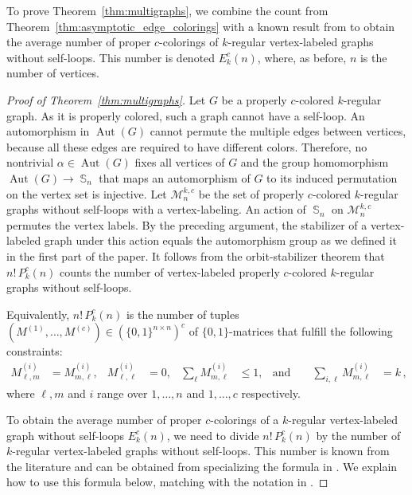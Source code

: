 \documentclass[a4paper,oneside]{amsart}
\numberwithin{theorem}{section}
\theoremstyle{remark}
\DeclareMathOperator{\Aut}{Aut}
\newcommand{\cE}{{P}}
\DeclareMathOperator{\Sym}{\mathbb{S}}
\begin{document}
To prove Theorem~\ref{thm:multigraphs}, we combine the count from Theorem~\ref{thm:asymptotic_edge_colorings} with a known result from \cite{bender1978asymptotic} to obtain the average number of proper $c$-colorings of $k$-regular vertex-labeled graphs without self-loops. This number is denoted ${E}^{c}_k(n)$, where, as before, $n$ is the number of vertices. 

\begin{proof}[Proof of Theorem~\ref{thm:multigraphs}]
  Let $G$ be a properly $c$-colored $k$-regular graph. As it is properly colored, such a graph cannot have a self-loop. An automorphism in $\Aut(G)$ cannot permute the multiple edges between vertices, because all these edges are required to have different colors. Therefore, no nontrivial $\alpha \in \Aut(G)$ fixes all vertices of $G$ and the group homomorphism $\Aut(G) \rightarrow \Sym_n$ that maps an automorphism of $G$ to its induced permutation on the vertex set is injective.
Let $\mathcal M_n^{k,c}$ be the set of 
properly $c$-colored $k$-regular graphs without self-loops with a vertex-labeling. An action of 
$\Sym_n$ on $\mathcal M_n^{k,c}$ permutes the vertex labels. By the preceding argument, the stabilizer of a vertex-labeled graph under this action equals the automorphism group as we defined it in the first part of the paper. It follows from the orbit-stabilizer theorem that $n!\, \cE^{c}_k(n)$ counts the number of vertex-labeled properly $c$-colored $k$-regular graphs without self-loops. 

Equivalently, $n!\, \cE^{c}_k(n)$ is the number of tuples $(M^{(1)}, \ldots, M^{(c)}) \in (\{0,1\}^{n\times n})^c$ of $\{0,1\}$-matrices that fulfill the following constraints:
\begin{align*}
M^{(i)}_{\ell,m} &= M^{(i)}_{m,\ell}, &
M^{(i)}_{\ell,\ell} &= 0, &
\sum_{\ell} M^{(i)}_{m,\ell} &\leq 1, & \text{and }&&
\sum_{i,\ell} M^{(i)}_{m,\ell} &= k  \,,
\end{align*}
where $\ell,m$ and $i$ 
range over $1,\ldots,n$ and $1,\ldots,c$ 
respectively. \par

To obtain the average number of proper $c$-colorings of a $k$-regular vertex-labeled graph without self-loops ${E}^{c}_k(n)$, we need to divide $n!\, \cE^{c}_k(n)$ by the number of $k$-regular vertex-labeled graphs without self-loops. This number is known from the literature and can be obtained from specializing the formula in \cite[Theorem 1]{bender1978asymptotic}. We explain how to use this formula below, matching with the notation in \cite{bender1978asymptotic}.\par


\end{proof}
\end{document}
